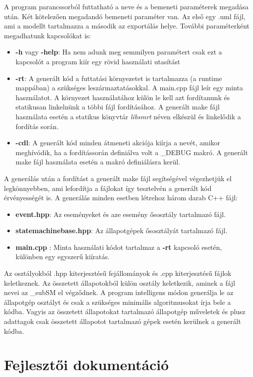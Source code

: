\documentclass[a4paper,12pt]{report}
\begin{document}
A program parancssorból futtatható a neve és a bemeneti paraméterek megadása után. Két kötelezően megadandó bemeneti paraméter van. Az első egy .uml fájl, ami a modellt tartalmazza a második az exportálás helye. További paraméterként megadhatunk kapcsolókat is:
\begin{itemize}
\item {\bf -h} vagy {\bf -help}: Ha nem adunk meg semmilyen paramétert csak ezt a kapcsolót a program kiír egy rövid használati utasítást
\item {\bf -rt}: A generált kód a futtatási környezetet is tartalmazza (a runtime mappában) a szükséges leszármaztatásokkal. A main.cpp fájl leír egy minta használatot. A környezet használatához külön le kell azt fordítanunk és statikusan linkelnünk a többi fájl fordításához. A generált make fájl használata esetén a statikus könyvtár {\it libsmrt} néven elkészül és linkelődik a fordítás során. 
\item {\bf -cdl}: A generált kód minden átmeneti akciója kiírja a nevét, amikor meghívódik, ha a fordítássorán definiálva volt a \_DEBUG makró. A generált make fájl használata esetén a makró definiálásra kerül.
\end{itemize}

A generálás után a fordítást a generált make fájl segítségével végezhetjük el legkönnyebben, ami lefordítja a fájlokat így tesztelvén a generált kód érvényességét is.
A generálás minden esetben létrehoz három darab C++ fájl:
\begin{itemize}
\item {\bf event.hpp}: Az eseményeket és aze esemény ősosztály tartalmazó fájl.
\item {\bf statemachinebase.hpp}: Az állapotgépek ősosztályát tartalmazó fájl.
\item {\bf main.cpp } : Minta használati kódot tartalmaz a {\bf -rt} kapcsoló esetén, különben egy egyszerű kiíratás.
\end{itemize}
Az osztályokból .hpp kiterjesztésű fejállományok és .cpp kiterjesztésű fájlok keletkeznek. Az összetett állapotokból külön osztály keletkezik, aminek a fájl nevei az \_subSM el végződnek. A program intelligens módon generálja le az állapotgép osztályt és csak a szükséges minimális algoritmusokat írja bele a kódba. Vagyis az összetett állapotokat tartalmazó állapotgép műveletek és plusz adattagok csak összetett állapotot tartalmazó gépek esetén kerülnek a generált kódba.

\section{Fejlesztői dokumentáció}
\end{document}
